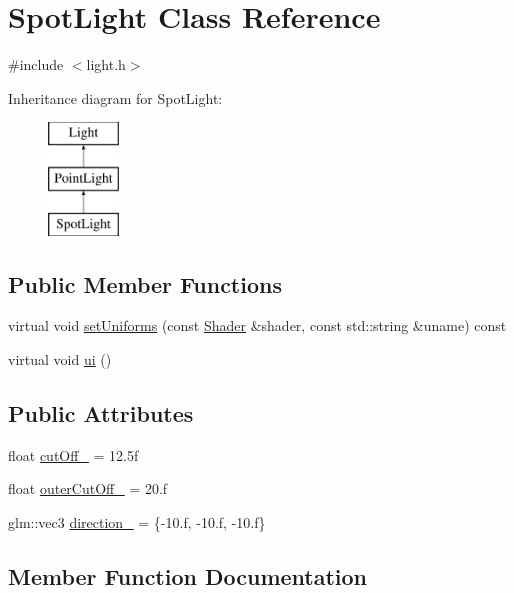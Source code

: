 \hypertarget{classSpotLight}{}\section{Spot\+Light Class Reference}
\label{classSpotLight}


{\ttfamily \#include $<$light.\+h$>$}

Inheritance diagram for Spot\+Light\+:\begin{figure}[H]
\begin{center}
\leavevmode
\includegraphics[height=3.000000cm]{classSpotLight}
\end{center}
\end{figure}
\subsection*{Public Member Functions}
\begin{DoxyCompactItemize}
\item 
virtual void \hyperlink{classSpotLight_a4599dbd0a665514ff7066bfa01d04d1e}{set\+Uniforms} (const \hyperlink{classShader}{Shader} \&shader, const std\+::string \&uname) const
\item 
virtual void \hyperlink{classSpotLight_a7ca46a2356ceb4f193704632e1f17bb4}{ui} ()
\end{DoxyCompactItemize}
\subsection*{Public Attributes}
\begin{DoxyCompactItemize}
\item 
float \hyperlink{classSpotLight_a434b4b2ad7072d34e238c529b6376608}{cut\+Off\+\_\+} = 12.\+5f
\item 
float \hyperlink{classSpotLight_aea3df0ad93a03e5a477ac431a394178d}{outer\+Cut\+Off\+\_\+} = 20.f
\item 
glm\+::vec3 \hyperlink{classSpotLight_a55620e0b9baa8ac72dacede2420bf121}{direction\+\_\+} = \{-\/10.f, -\/10.f, -\/10.f\}
\end{DoxyCompactItemize}


\subsection{Member Function Documentation}
\mbox{\label{classSpotLight_a4599dbd0a665514ff7066bfa01d04d1e}} 
